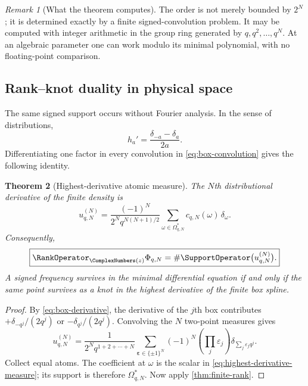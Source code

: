 \documentclass[11pt]{article}
\numberwithin{equation}{section}
\newtheorem{theorem}{Theorem}[section]
\theoremstyle{definition}
\theoremstyle{remark}
\newtheorem{remark}[theorem]{Remark}
\newcommand{\eps}{\varepsilon}
\begin{document}
\begin{remark}[What the theorem computes]
The order is not merely bounded by $2^N$; it is determined exactly by a finite
signed-convolution problem.  It may be computed with integer arithmetic in the
group ring generated by $q,q^2,\ldots,q^N$.  At an algebraic parameter one can
work modulo its minimal polynomial, with no floating-point comparison.
\end{remark}

\subsection{Rank--knot duality in physical space}

The same signed support occurs without Fourier analysis.  In the sense of
distributions,
\begin{equation}
 h_a'=\frac{\delta_{-a}-\delta_a}{2a}.
 \label{eq:box-derivative}
\end{equation}
Differentiating one factor in every convolution in \eqref{eq:box-convolution}
gives the following identity.

\begin{theorem}[Highest-derivative atomic measure]
\label{thm:rank-knot}
The $N$th distributional derivative of the finite density is
\begin{equation}
 u_{q,N}^{(N)}=
 \frac{(-1)^N}{2^Nq^{N(N+1)/2}}
 \sum_{\omega\in\Omega^*_{q,N}}c_{q,N}(\omega)\,\delta_\omega.
 \label{eq:highest-derivative-measure}
\end{equation}
Consequently,
\begin{equation}
 \boxed{
 \RankOperator_{\ComplexNumbers(z)}\Phi_{q,N}
 =\#\SupportOperator\bigl(u_{q,N}^{(N)}\bigr).}
 \label{eq:rank-knot-box}
\end{equation}
A signed frequency survives in the minimal differential equation if and only if
the same point survives as a knot in the highest derivative of the finite box
spline.
\end{theorem}
\begin{proof}
By \eqref{eq:box-derivative}, the derivative of the $j$th box contributes
$+\delta_{-q^j}/(2q^j)$ or $-\delta_{q^j}/(2q^j)$.  Convolving the $N$ two-point
measures gives
\[
 u_{q,N}^{(N)}=
 \frac{1}{2^Nq^{1+2+\cdots+N}}
 \sum_{\bm\eps\in\{\pm1\}^N}
 (-1)^N\left(\prod_j\eps_j\right)
 \delta_{\sum_j\eps_jq^j}.
\]
Collect equal atoms.  The coefficient at $\omega$ is the scalar in
\eqref{eq:highest-derivative-measure}; its support is therefore
$\Omega^*_{q,N}$.  Now apply \cref{thm:finite-rank}.
\end{proof}
\end{document}
